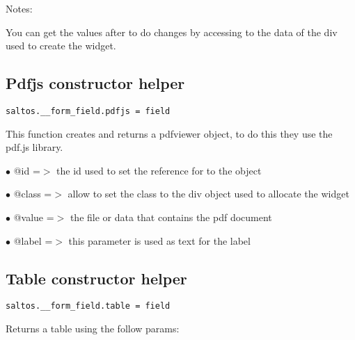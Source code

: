 \documentclass[a4paper]{book}
\begin{document}
Notes:

You can get the values after to do changes by accessing to the data of the div used to create
the widget.

\hypertarget{toc397}{}
\subsection{Pdfjs constructor helper}

\begin{lstlisting}
saltos.__form_field.pdfjs = field
\end{lstlisting}

This function creates and returns a pdfviewer object, to do this they use the pdf.js library.

\begin{compactitem}
\item[\color{myblue}$\bullet$] @id    =$>$ the id used to set the reference for to the object
\item[\color{myblue}$\bullet$] @class =$>$ allow to set the class to the div object used to allocate the widget
\item[\color{myblue}$\bullet$] @value =$>$ the file or data that contains the pdf document
\item[\color{myblue}$\bullet$] @label =$>$ this parameter is used as text for the label
\end{compactitem}

\hypertarget{toc398}{}
\subsection{Table constructor helper}

\begin{lstlisting}
saltos.__form_field.table = field
\end{lstlisting}

Returns a table using the follow params:
\end{document}
